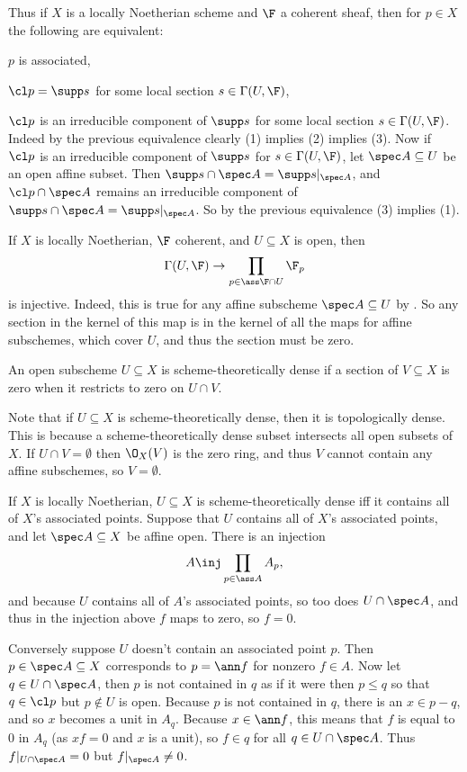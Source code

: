 Thus if $X$ is a locally Noetherian scheme and $\F$ a coherent sheaf, then for $p\in X$ the following are equivalent:
\benum
    \item $p$ is associated,
    \item $\cl p=\supp s$ for some local section $s\in\Gamma(U,\F)$,
    \item $\cl p$ is an irreducible component of $\supp s$ for some local section $s\in\Gamma(U,\F)$.
\eenum
Indeed by the previous equivalence clearly (1) implies (2) implies (3).
Now if $\cl p$ is an irreducible component of $\supp s$ for $s\in\Gamma(U,\F)$, let $\spec A\subseteq U$ be an open affine subset.
Then $\supp s\cap\spec A=\supp s|_{\spec A}$, and $\cl p\cap\spec A$ remains an irreducible component of $\supp s\cap\spec A=\supp s|_{\spec A}$.
So by the previous equivalence (3) implies (1).

If $X$ is locally Noetherian, $\F$ coherent, and $U\subseteq X$ is open, then
$$ \Gamma(U,\F) \to \prod_{p\in\ass\F\cap U}\F_p $$
is injective.
Indeed, this is true for any affine subscheme $\spec A\subseteq U$ by .
So any section in the kernel of this map is in the kernel of all the maps for affine subschemes, which cover $U$, and thus the section must be zero.

\bdefn

    An open subscheme $U\subseteq X$ is {\emphcolor scheme-theoretically dense} if a section of $V\subseteq X$ is zero when it restricts to zero on $U\cap V$.

\edefn

Note that if $U\subseteq X$ is scheme-theoretically dense, then it is topologically dense.
This is because a scheme-theoretically dense subset intersects all open subsets of $X$.
If $U\cap V=\emptyset$ then $\O_X(V)$ is the zero ring, and thus $V$ cannot contain any affine subschemes, so $V=\emptyset$.

If $X$ is locally Noetherian, $U\subseteq X$ is scheme-theoretically dense iff it contains all of $X$'s associated points.
Suppose that $U$ contains all of $X$'s associated points, and let $\spec A\subseteq X$ be affine open.
There is an injection
$$ A \inj \prod_{p\in\ass A}A_p , $$
and because $U$ contains all of $A$'s associated points, so too does $U\cap\spec A$, and thus in the injection above $f$ maps to zero, so $f=0$.

Conversely suppose $U$ doesn't contain an associated point $p$.
Then $p\in\spec A\subseteq X$ corresponds to $p=\ann f$ for nonzero $f\in A$.
Now let $q\in U\cap\spec A$, then $p$ is not contained in $q$ as if it were then $p\leq q$ so that $q\in\cl p$ but $p\notin U$ is open.
Because $p$ is not contained in $q$, there is an $x\in p-q$, and so $x$ becomes a unit in $A_q$.
Because $x\in\ann f$, this means that $f$ is equal to $0$ in $A_q$ (as $xf=0$ and $x$ is a unit), so $f\in q$ for all $q\in U\cap\spec A$.
Thus $f|_{U\cap\spec A}=0$ but $f|_{\spec A}\neq0$.

